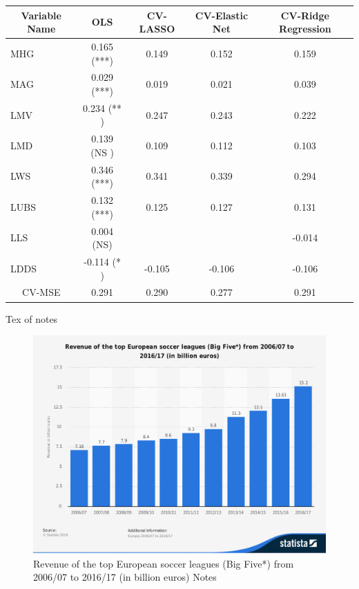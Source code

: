 \documentclass[inte,blindrev]{informs3}
\begin{document}
\begin{table}
{\begin{tabular}{|l|c|c|c|c|}
\hline 
\multicolumn{1}{|c|}{Variable Name} & \multicolumn{1}{c|}{OLS} & CV-LASSO & CV-Elastic Net & CV-Ridge Regression\tabularnewline
\hline 
MHG & 0.165 ({*}{*}{*}) & 0.149 & 0.152 & 0.159\tabularnewline
\hline 
MAG & 0.029 ({*}{*}{*}) & 0.019 & 0.021 & 0.039\tabularnewline
\hline 
LMV & 0.234 ({*}{*} )  & 0.247 & 0.243 & 0.222\tabularnewline
\hline 
LMD & 0.139 (NS ) & 0.109 & 0.112 & 0.103\tabularnewline
\hline 
LWS & 0.346 ({*}{*}{*}) & 0.341 & 0.339 & 0.294\tabularnewline
\hline 
LUBS & 0.132 ({*}{*}{*}) & 0.125 & 0.127 & 0.131\tabularnewline
\hline 
LLS & 0.004 (NS) &  &  & -0.014\tabularnewline
\hline 
LDDS & -0.114 ({*} )  & -0.105 & -0.106 & -0.106\tabularnewline
\hline 
\multicolumn{1}{|c|}{CV-MSE} & \multicolumn{1}{c|}{0.291} & 0.290 & 0.277 & 0.291\tabularnewline
\hline 
\end{tabular}}
{Tex of notes}
\end{table}



\begin{figure}
\FIGURE
{\includegraphics[width=1.0\textwidth]{Figure1}}
{Revenue of the top European soccer leagues (Big Five*) from 2006/07 to 2016/17 (in billion euros)\label{Fig1}}
{Notes}
\end{figure}
\end{document}
